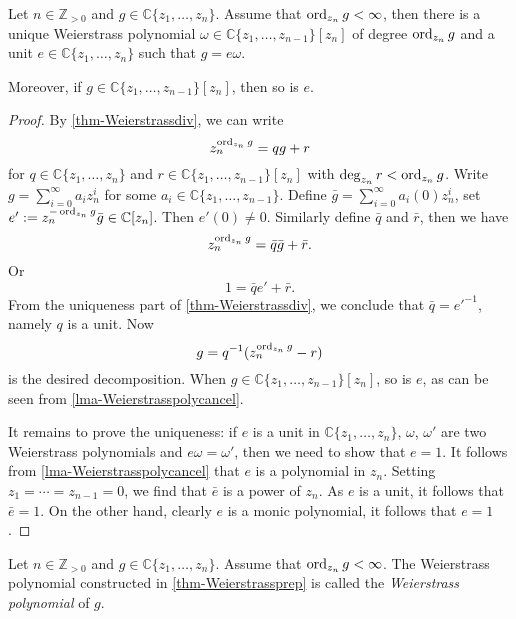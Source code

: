 \begin{theorem}\label{thm-Weierstrassprep}
    Let $n\in \mathbb{Z}_{>0}$ and $g\in \mathbb{C}\{ z_1,\ldots,z_{n}\}$. Assume that $\operatorname{ord}_{z_n}g<\infty$, then there is a unique Weierstrass polynomial $\omega\in \mathbb{C}\{ z_1,\ldots,z_{n-1}\}[z_n]$ of degree $\operatorname{ord}_{z_n}g$ and a unit $e\in \mathbb{C}\{ z_1,\ldots,z_{n}\}$ such that $g=e\omega$.
    
    Moreover, if $g\in \mathbb{C}\{ z_1,\ldots,z_{n-1}\}[z_n]$, then so is $e$.
\end{theorem}
\begin{proof}
    By \cref{thm-Weierstrassdiv}, we can write
    \[
      z_n^{\operatorname{ord}_{z_n}g}=qg+r  
    \]
    for $q\in \mathbb{C}\{ z_1,\ldots,z_{n}\}$ and $r\in \mathbb{C}\{ z_1,\ldots,z_{n-1}\}[z_n]$ with $\deg_{z_n}r<\operatorname{ord}_{z_n}g$. Write $g=\sum_{i=0}^{\infty}a_i z_n^i$ for some $a_i\in \mathbb{C}\{ z_1,\ldots,z_{n-1}\}$. Define $\bar{g}=\sum_{i=0}^{\infty}a_i(0)z_n^i$, set $e':=z_n^{-\operatorname{ord}_{z_n}g}\bar{g}\in \mathbb{C}[z_n]$. Then $e'(0)\neq 0$. Similarly define $\bar{q}$ and $\bar{r}$, then we have
    \[
        z_n^{\operatorname{ord}_{z_n}g}=\bar{q} \bar{g}+\bar{r}.  
    \]
    Or
    \[
      1=\bar{q}e'+\bar{r}.  
    \]
    From the uniqueness part of \cref{thm-Weierstrassdiv}, we conclude that $\bar{q}=e'^{-1}$, namely $q$ is a unit. Now
    \[
        g=q^{-1} (z_n^{\operatorname{ord}_{z_n}g}-r)  
    \]
    is the desired decomposition. When $g\in \mathbb{C}\{ z_1,\ldots,z_{n-1}\}[z_n]$, so is $e$, as can be seen from \cref{lma-Weierstrasspolycancel}.

    It remains to prove the uniqueness: if $e$ is a unit in $\mathbb{C}\{ z_1,\ldots,z_{n}\}$, $\omega$, $\omega'$ are two Weierstrass polynomials and $e\omega=\omega'$, then we need to show that $e=1$. It follows from \cref{lma-Weierstrasspolycancel} that $e$ is a polynomial in $z_n$. Setting $z_1=\cdots=z_{n-1}=0$, we find that $\bar{e}$ is a power of $z_n$. As $e$ is a unit, it follows that $\bar{e}=1$. On the other hand, clearly $e$ is a monic polynomial, it follows that $e=1$.
\end{proof}

\begin{definition}
    Let $n\in \mathbb{Z}_{>0}$ and $g\in \mathbb{C}\{ z_1,\ldots,z_{n}\}$. Assume that $\operatorname{ord}_{z_n}g<\infty$. The Weierstrass polynomial constructed in \cref{thm-Weierstrassprep} is called the \emph{Weierstrass polynomial} of $g$.
\end{definition}

